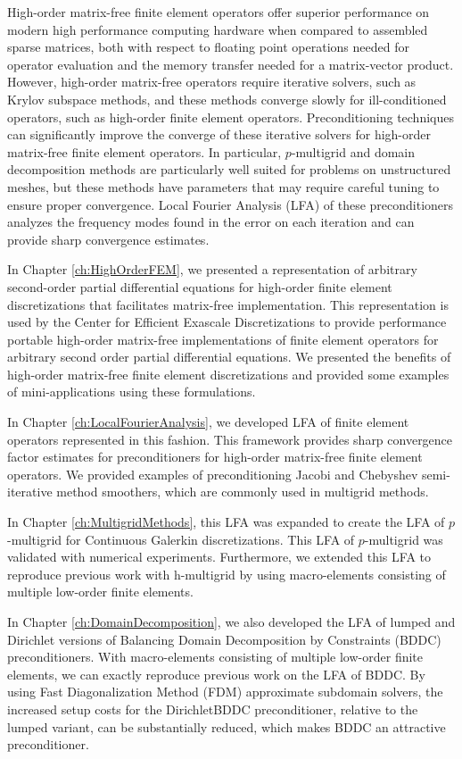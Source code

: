 High-order matrix-free finite element operators offer superior performance on modern high performance computing hardware when compared to assembled sparse matrices, both with respect to floating point operations needed for operator evaluation and the memory transfer needed for a matrix-vector product.
However, high-order matrix-free operators require iterative solvers, such as Krylov subspace methods, and these methods converge slowly for ill-conditioned operators, such as high-order finite element operators.
Preconditioning techniques can significantly improve the converge of these iterative solvers for high-order matrix-free finite element operators.
In particular, $p$-multigrid and domain decomposition methods are particularly well suited for problems on unstructured meshes, but these methods have parameters that may require careful tuning to ensure proper convergence.
Local Fourier Analysis (LFA) of these preconditioners analyzes the frequency modes found in the error on each iteration and can provide sharp convergence estimates.

In Chapter \ref{ch:HighOrderFEM}, we presented a representation of arbitrary second-order partial differential equations for high-order finite element discretizations that facilitates matrix-free implementation.
This representation is used by the Center for Efficient Exascale Discretizations to provide performance portable high-order matrix-free implementations of finite element operators for arbitrary second order partial differential equations.
We presented the benefits of high-order matrix-free finite element discretizations and provided some examples of mini-applications using these formulations.

In Chapter \ref{ch:LocalFourierAnalysis}, we developed LFA of finite element operators represented in this fashion.
This framework provides sharp convergence factor estimates for preconditioners for high-order matrix-free finite element operators.
We provided examples of preconditioning Jacobi and Chebyshev semi-iterative method smoothers, which are commonly used in multigrid methods.

In Chapter \ref{ch:MultigridMethods}, this LFA was expanded to create the LFA of $p$-multigrid for Continuous Galerkin discretizations.
This LFA of $p$-multigrid was validated with numerical experiments.
Furthermore, we extended this LFA to reproduce previous work with h-multigrid by using macro-elements consisting of multiple low-order finite elements.

In Chapter \ref{ch:DomainDecomposition}, we also developed the LFA of lumped and Dirichlet versions of Balancing Domain Decomposition by Constraints (BDDC) preconditioners.
With macro-elements consisting of multiple low-order finite elements, we can exactly reproduce previous work on the LFA of BDDC.
By using Fast Diagonalization Method (FDM) approximate subdomain solvers, the increased setup costs for the DirichletBDDC preconditioner, relative to the lumped variant, can be substantially reduced, which makes BDDC an attractive preconditioner.

